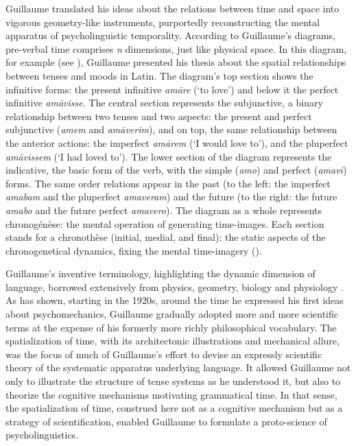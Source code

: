 \documentclass[english,output=paper,colorlinks,citecolor=brown]{../langscibook}
\begin{document}
Guillaume translated his ideas about the relations between time and space into vigorous geometry-like instruments, purportedly reconstructing the mental apparatus of psycholinguistic temporality. According to Guillaume’s diagrams, pre-verbal time comprises \textit{n} dimensions, just like physical space. In this diagram, for example (see ), Guillaume presented his thesis about the spatial relationships between tenses and moods in Latin. The diagram’s top section shows the infinitive forms: the present infinitive \textit{amāre} (`to love') and below it the perfect infinitive \textit{am{āvisse}}. The central section represents the subjunctive, a binary relationship between two tenses and two aspects: the present and perfect subjunctive (\textit{amem} and \textit{amāverim}), and on top, the same relationship between the anterior actions: the imperfect \textit{amārem} (`I would love to'), and the pluperfect \textit{amāvissem} (`I had loved to'). The lower section of the diagram represents the indicative, the basic form of the verb, with the simple (\textit{amo}) and perfect (\textit{amavi}) forms. The same order relations appear in the past (to the left: the imperfect \textit{amabam} and the pluperfect \textit{amaveram}) and the future (to the right: the future \textit{amabo} and the future perfect \textit{amavero}). The diagram as a whole represents chronogénèse: the mental operation of generating time-images. Each section stands for a chronothèse (initial, medial, and final): the static aspects of the chronogenetical dynamics, fixing the mental time-imagery (\citealt{BooneJoly1996}).

Guillaume’s inventive terminology, highlighting the dynamic dimension of language, borrowed extensively from physics, geometry, biology and physiology \citep{Bottineau2006}. As \citet{Valette2003} has shown, starting in the 1920s, around the time he expressed his first ideas about psychomechanics, Guillaume gradually adopted more and more scientific terms at the expense of his formerly more richly philosophical vocabulary. The spatialization of time, with its architectonic illustrations and mechanical allure, was the focus of much of Guillaume’s effort to devise an expressly scientific theory of the systematic apparatus underlying language. It allowed Guillaume not only to illustrate the structure of tense systems as he understood it, but also to theorize the cognitive mechanisms motivating grammatical time. In that sense, the spatialization of time, construed here not as a cognitive mechanism but as a strategy of scientification, enabled Guillaume to formulate a proto-science of psycholinguistics.
\end{document}
